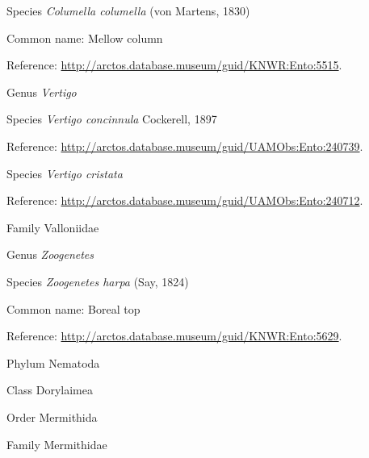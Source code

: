 \documentclass[9pt, article]{memoir}
\begin{document}
\begin{multicols}{2}
\vspace{6pt}\noindent\hspace{36pt}Species \textit{Columella columella} (von Martens, 1830)


Common name: Mellow column

Reference: 
\url{http://arctos.database.museum/guid/KNWR:Ento:5515}.

\vspace{6pt}\noindent\hspace{30pt}Genus \textit{Vertigo}


\vspace{6pt}\noindent\hspace{36pt}Species \textit{Vertigo concinnula} Cockerell, 1897


Reference: 
\url{http://arctos.database.museum/guid/UAMObs:Ento:240739}.

\vspace{6pt}\noindent\hspace{36pt}Species \textit{Vertigo cristata}


Reference: 
\url{http://arctos.database.museum/guid/UAMObs:Ento:240712}.

\vspace{6pt}\noindent\hspace{24pt}Family Valloniidae


\vspace{6pt}\noindent\hspace{30pt}Genus \textit{Zoogenetes}


\vspace{6pt}\noindent\hspace{36pt}Species \textit{Zoogenetes harpa} (Say, 1824)


Common name: Boreal top

Reference: 
\url{http://arctos.database.museum/guid/KNWR:Ento:5629}.

\vspace{6pt}\noindent\hspace{6pt}Phylum Nematoda


\vspace{6pt}\noindent\hspace{12pt}Class Dorylaimea


\vspace{6pt}\noindent\hspace{18pt}Order Mermithida


\vspace{6pt}\noindent\hspace{24pt}Family Mermithidae



\end{multicols}
\end{document}
